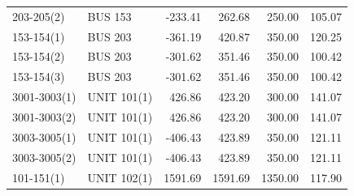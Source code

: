 \documentclass[10pt]{report}
\begin{document}
\begin{table}[H]
{\begin{tabular}{llrrrr}
203-205(2) & BUS 153 & -233.41 & 262.68 & 250.00 & 105.07 \\
153-154(1) & BUS 203 & -361.19 & 420.87 & 350.00 & 120.25 \\
153-154(2) & BUS 203 & -301.62 & 351.46 & 350.00 & 100.42 \\
153-154(3) & BUS 203 & -301.62 & 351.46 & 350.00 & 100.42 \\
3001-3003(1) & UNIT 101(1) & 426.86 & 423.20 & 300.00 & 141.07 \\
3001-3003(2) & UNIT 101(1) & 426.86 & 423.20 & 300.00 & 141.07 \\
3003-3005(1) & UNIT 101(1) & -406.43 & 423.89 & 350.00 & 121.11 \\
3003-3005(2) & UNIT 101(1) & -406.43 & 423.89 & 350.00 & 121.11 \\
101-151(1) & UNIT 102(1) & 1591.69 & 1591.69 & 1350.00 & 117.90 \\
\bottomrule
\end{tabular}}
\end{table}
\end{document}
